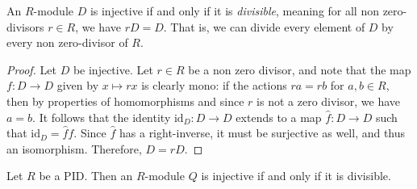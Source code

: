 \begin{proposition}\label{prp:8.10}
	An $R$-module $D$ is injective if and only if it is \emph{divisible}, meaning for all non zero-divisors $r\in R$, we have $rD=D$. That is, we can divide every element of $D$ by every non zero-divisor of $R$.
\end{proposition}
\begin{proof}
	Let $D$ be injective. Let $r\in R$ be a non zero divisor, and note that the map $f : D \to D$ given by $x\mapsto rx$ is clearly mono: if the actions $ra=rb$ for $a,b\in R$, then by properties of homomorphisms and since $r$ is not a zero divisor, we have $a=b$. It follows that the identity $\mathrm{id}_D : D \to D$ extends to a map $\hat{f} : D \to D$ such that $\mathrm{id}_D=\hat{f} f$. Since $\hat{f} $ has a right-inverse, it must be surjective as well, and thus an isomorphism. Therefore, $D=rD$.
\end{proof}

\begin{corollary}\label{cor:8.8}
	Let $R$ be a PID. Then an $R$-module $Q$ is injective if and only if it is divisible.
\end{corollary}

